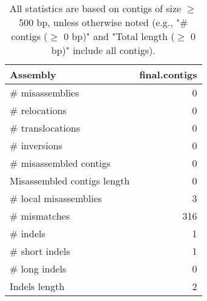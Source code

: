 \documentclass[12pt,a4paper]{article}
\begin{document}
\begin{table}[ht]
\begin{center}
\caption{All statistics are based on contigs of size $\geq$ 500 bp, unless otherwise noted (e.g., "\# contigs ($\geq$ 0 bp)" and "Total length ($\geq$ 0 bp)" include all contigs).}
\begin{tabular}{|l*{1}{|r}|}
\hline
Assembly & final.contigs \\ \hline
\# misassemblies & 0 \\ \hline
\hspace{5mm}\# relocations & 0 \\ \hline
\hspace{5mm}\# translocations & 0 \\ \hline
\hspace{5mm}\# inversions & 0 \\ \hline
\# misassembled contigs & 0 \\ \hline
Misassembled contigs length & 0 \\ \hline
\# local misassemblies & 3 \\ \hline
\# mismatches & 316 \\ \hline
\# indels & 1 \\ \hline
\hspace{5mm}\# short indels & 1 \\ \hline
\hspace{5mm}\# long indels & 0 \\ \hline
Indels length & 2 \\ \hline
\end{tabular}
\end{center}
\end{table}
\end{document}
